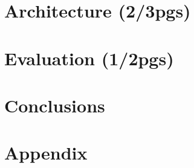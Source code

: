 \documentclass{./llncs2e/llncs}
\begin{document}
\section{Architecture (2/3pgs)}

\section{Evaluation (1/2pgs)}

\section{Conclusions}

\newpage
\appendix
\section{Appendix}
\label{sec:attachments}


% 
% 
 

 
\end{document}
